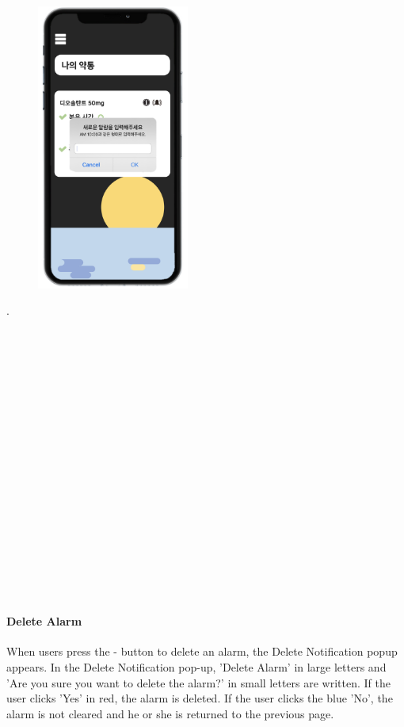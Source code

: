 \documentclass[conference]{IEEEtran}
\begin{document}
\begin{figure}[h!]
\centering
\includegraphics[width=5cm]{final_image_folder/pillbox_alarm_add.png}
\caption{}
\label{fig:map}
\end{figure}
.\\
\\
\\
\\
\\
\\
\\
\\
\\
\\
\\
\\
\\
\\
\\
\\
\\
\\
\\

\paragraph{Delete Alarm}
When users press the - button to delete an alarm, the Delete Notification popup appears. In the Delete Notification pop-up, 'Delete Alarm' in large letters and 'Are you sure you want to delete the alarm?' in small letters are written. If the user clicks 'Yes' in red, the alarm is deleted. If the user clicks the blue 'No', the alarm is not cleared and he or she is returned to the previous page.\\
\end{document}

